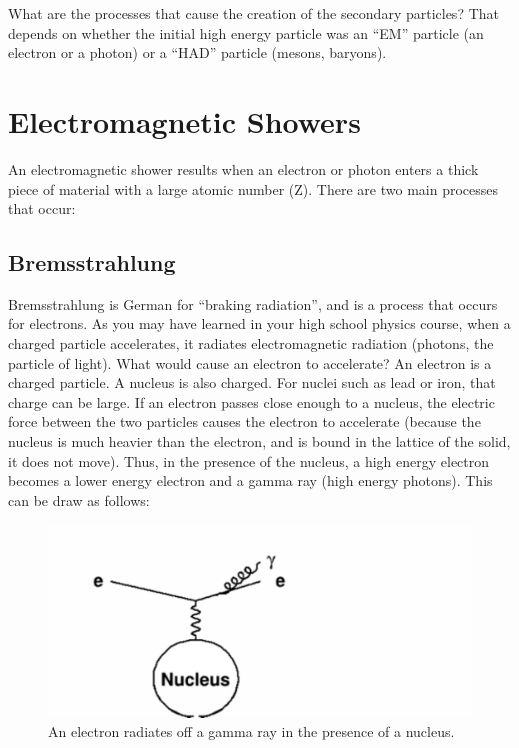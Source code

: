 \;

\noindent
What are the processes that cause the creation of the secondary particles? That depends on whether the initial high energy particle was an ``EM'' particle (an electron or a photon) or a ``HAD'' particle (mesons, baryons).

\section{Electromagnetic Showers}

\noindent
An electromagnetic shower results when an electron or photon enters a thick piece of material with a large atomic number (Z). There are two main processes that occur:

\subsection{Bremsstrahlung}

\noindent
Bremsstrahlung is German for ``braking radiation'', and is a process that occurs for electrons. As you may have learned in your high school physics course, when a charged particle accelerates, it radiates electromagnetic radiation (photons, the particle of light). What would cause an electron to accelerate? An electron is a charged particle. A nucleus is also charged. For nuclei such as lead or iron, that charge can be large. If an electron passes close enough to a nucleus, the electric force between the two particles causes the electron to accelerate (because the nucleus is much heavier than the electron, and is bound in the lattice of the solid, it does not move). Thus, in the presence of the nucleus, a high energy electron becomes a lower energy electron and a gamma ray (high energy photons). This can be draw as follows:


\;
\;

\begin{figure}[h]
\centering\includegraphics[scale=0.7]{./calorimetry/Pictures/fig2.pdf}
\caption{An electron radiates off a gamma ray in the presence of a nucleus.}
\label{fig:pdgdedx}
\end{figure}

